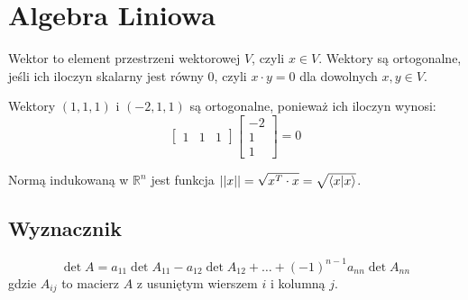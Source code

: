 \documentclass{../notatki}
\begin{document}
\section{Algebra Liniowa}

Wektor to element przestrzeni wektorowej $V$, czyli $x \in V$. Wektory są
ortogonalne, jeśli ich iloczyn skalarny jest równy 0, czyli $x \cdot y = 0$ dla
dowolnych $x, y \in V$.

\begin{examplebox}
  Wektory $(1, 1, 1)$ i $(-2, 1, 1)$ są ortogonalne, ponieważ ich
  iloczyn wynosi:
  $$
  \begin{bmatrix}
    1 & 1 & 1
  \end{bmatrix}
  \begin{bmatrix}
    -2 \\ 1 \\ 1
  \end{bmatrix}
  = 0
  $$
\end{examplebox}

Normą indukowaną w $\mathbb{R}^n$ jest funkcja $||x|| = \sqrt{x^T
\cdot x} = \sqrt{\braket{x}{x}}$.

\subsection{Wyznacznik}

$$
\det A = a_{11} \det A_{11} - a_{12} \det A_{12} + \dots + (-1)^{n-1}
a_{nn} \det A_{nn}
$$
gdzie $A_{ij}$ to macierz $A$ z usuniętym wierszem $i$ i kolumną $j$.
\end{document}
